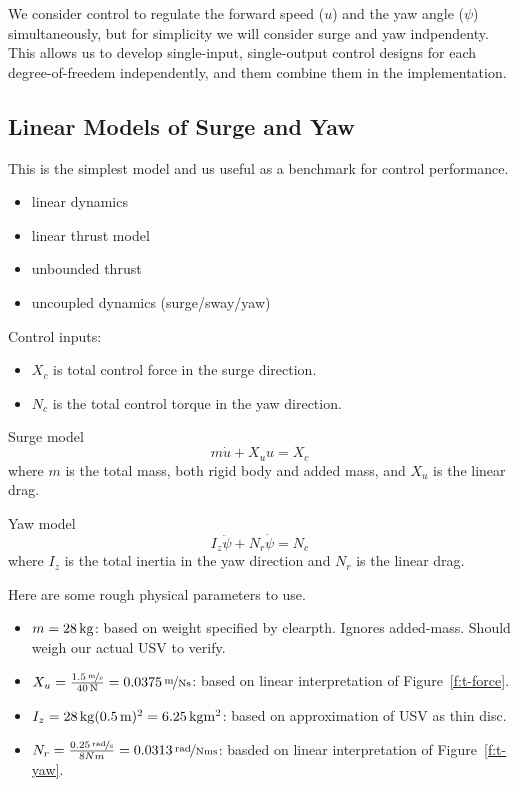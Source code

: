 \documentclass[11pt,draftcls,journal,onecolumn]{IEEEtran}
\begin{document}
We consider control to regulate the forward speed ($u$) and the yaw angle ($\psi$) simultaneously, but for simplicity we will consider surge and yaw indpendenty.  This allows us to develop single-input, single-output control designs for each degree-of-freedem independently, and them combine them in the implementation.

\subsection{Linear Models of Surge and Yaw}
This is the simplest model and us useful as a benchmark for control performance.
\begin{itemize}
\item linear dynamics
\item linear thrust model
\item unbounded thrust
\item uncoupled dynamics (surge/sway/yaw)
\end{itemize}

Control inputs:
\begin{itemize}
\item $X_c$ is total control force in the surge direction.
\item $N_c$ is the total control torque in the yaw direction.
\end{itemize}

Surge model
\[
m \dot{u} + X_u u = X_c
\]
where $m$ is the total mass, both rigid body and added mass, and $X_u$ is the linear drag.

Yaw model
\[
I_z \ddot{\psi} + N_r \dot{\psi} = N_c
\]
where $I_z$ is the total inertia in the yaw direction and $N_r$ is the linear drag.

Here are some rough physical parameters to use.
\begin{itemize}
\item $m=\unit[28]{kg}$: based on weight specified by clearpth.  Ignores added-mass.  Should weigh our actual USV to verify.
\item $X_u=\frac{\unitfrac[1.5]{m}{s}}{\unit[40]{N}}=\unitfrac[0.0375]{m}{Ns}$: based on linear interpretation of Figure~\ref{f:t-force}.
\item $I_z = \unit[28]{kg} (\unit[0.5]{m})^2 = \unit[6.25]{kg m^2}$: based on approximation of USV as thin disc.
\item $N_r = \frac{\unitfrac[0.25]{rad}{s}}{\unit{8}{Nm}} = \unitfrac[0.0313]{rad}{Nms}$: basded on linear interpretation of Figure~\ref{f:t-yaw}.
\end{itemize}
\end{document}
